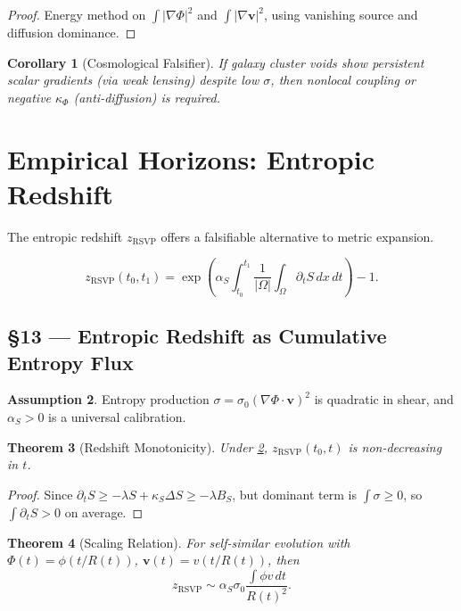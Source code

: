 \documentclass[11pt]{article}
\newtheorem{theorem}{Theorem}[section]
\newtheorem{corollary}[theorem]{Corollary}
\theoremstyle{definition}
\newtheorem{assumption}[theorem]{Assumption}
\theoremstyle{remark}
\newcommand{\vect}[1]{\bm{#1}}
\begin{document}
\begin{proof}
Energy method on $\int |\nabla \Phi|^2$ and $\int |\nabla \vect{v}|^2$, using vanishing source and diffusion dominance.
\end{proof}

\begin{corollary}[Cosmological Falsifier]
If galaxy cluster voids show persistent scalar gradients (via weak lensing) despite low $\sigma$, then nonlocal coupling or negative $\kappa_\Phi$ (anti-diffusion) is required.
\end{corollary}

\section{Empirical Horizons: Entropic Redshift}
The entropic redshift $z_{\mathrm{RSVP}}$ offers a falsifiable alternative to metric expansion.

\begin{equation}
\boxed{z_{\mathrm{RSVP}}(t_0,t_1) = \exp\left(\alpha_S \int_{t_0}^{t_1} \frac{1}{|\Omega|} \int_\Omega \partial_t S\,dx\,dt \right)-1.}
\label{eq:redshift_avg}
\end{equation}

\subsection*{§13 — Entropic Redshift as Cumulative Entropy Flux}

\begin{assumption}
\label{ass:redshift}
Entropy production $\sigma = \sigma_0 (\nabla \Phi \cdot \vect{v})^2$ is quadratic in shear, and $\alpha_S > 0$ is a universal calibration.
\end{assumption}

\begin{theorem}[Redshift Monotonicity]
Under \cref{ass:redshift}, $z_{\mathrm{RSVP}}(t_0,t)$ is non-decreasing in $t$.
\end{theorem}

\begin{proof}
Since $\partial_t S \ge -\lambda S + \kappa_S \Delta S \ge -\lambda B_S$, but dominant term is $\int \sigma \ge 0$, so $\int \partial_t S > 0$ on average.
\end{proof}

\begin{theorem}[Scaling Relation]
For self-similar evolution with $\Phi(t) = \phi(t/R(t))$, $\vect{v}(t) = v(t/R(t))$, then
\[
z_{\mathrm{RSVP}} \sim \alpha_S \sigma_0 \frac{\int \phi v \, dt}{R(t)^2}.
\]
\end{theorem}
\end{document}
